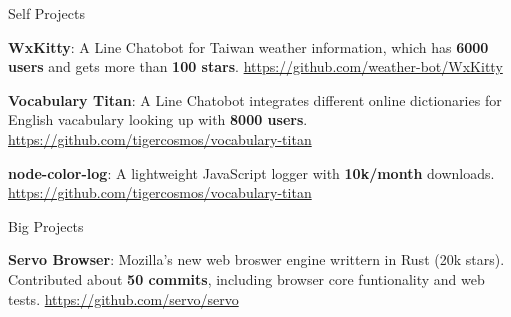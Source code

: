 

\begin{cventries}

  \cventry
    {} %
    {Self Projects} %
    {} %
    {} %
    {
      \vspace{-2mm}
      \begin{cvitems} %
        \item {\textbf{WxKitty}: A Line Chatobot for Taiwan weather information, which has \textbf{6000 users}
        and gets more than \textbf{100 stars}. \url{https://github.com/weather-bot/WxKitty}}
        \item {\textbf{Vocabulary Titan}: A Line Chatobot integrates different online dictionaries for English vacabulary looking up
        with \textbf{8000 users}. \url{https://github.com/tigercosmos/vocabulary-titan}}
        \item {\textbf{node-color-log}: A lightweight JavaScript logger with \textbf{10k/month} downloads. \url{https://github.com/tigercosmos/vocabulary-titan}}
      \end{cvitems}
    }
  \vspace{-2mm}
  \cventry
    {} %
    {Big Projects} %
    {} %
    {} %
    {
      \vspace{-2mm}
      \begin{cvitems} %
        \item {\textbf{Servo Browser}: Mozilla's new web broswer engine writtern in Rust (20k stars).
        Contributed about \textbf{50 commits}, including browser core funtionality and web tests.
        \url{https://github.com/servo/servo}
        }
      \end{cvitems}
    }

\end{cventries}
